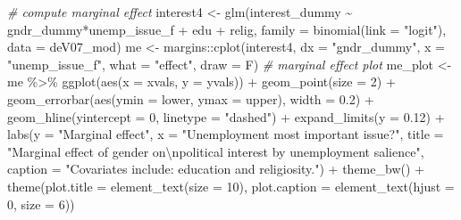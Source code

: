 \documentclass[
]{article}
\newenvironment{Shaded}{\begin{snugshade}}{\end{snugshade}}
\newcommand{\AttributeTok}[1]{\textcolor[rgb]{0.77,0.63,0.00}{#1}}
\newcommand{\CommentTok}[1]{\textcolor[rgb]{0.56,0.35,0.01}{\textit{#1}}}
\newcommand{\DecValTok}[1]{\textcolor[rgb]{0.00,0.00,0.81}{#1}}
\newcommand{\FloatTok}[1]{\textcolor[rgb]{0.00,0.00,0.81}{#1}}
\newcommand{\FunctionTok}[1]{\textcolor[rgb]{0.00,0.00,0.00}{#1}}
\newcommand{\NormalTok}[1]{#1}
\newcommand{\OtherTok}[1]{\textcolor[rgb]{0.56,0.35,0.01}{#1}}
\newcommand{\SpecialCharTok}[1]{\textcolor[rgb]{0.00,0.00,0.00}{#1}}
\newcommand{\StringTok}[1]{\textcolor[rgb]{0.31,0.60,0.02}{#1}}
\begin{document}
\begin{Shaded}
\begin{Highlighting}[]
\CommentTok{\# compute marginal effect}
\NormalTok{interest4 }\OtherTok{\textless{}{-}} \FunctionTok{glm}\NormalTok{(interest\_dummy }\SpecialCharTok{\textasciitilde{}}\NormalTok{ gndr\_dummy}\SpecialCharTok{*}\NormalTok{unemp\_issue\_f }\SpecialCharTok{+}\NormalTok{ edu }\SpecialCharTok{+}\NormalTok{ relig, }
                 \AttributeTok{family =} \FunctionTok{binomial}\NormalTok{(}\AttributeTok{link =} \StringTok{"logit"}\NormalTok{), }
                 \AttributeTok{data =}\NormalTok{ deV07\_mod)}
\NormalTok{me }\OtherTok{\textless{}{-}}\NormalTok{ margins}\SpecialCharTok{::}\FunctionTok{cplot}\NormalTok{(interest4, }\AttributeTok{dx =} \StringTok{"gndr\_dummy"}\NormalTok{, }
               \AttributeTok{x =} \StringTok{"unemp\_issue\_f"}\NormalTok{, }\AttributeTok{what =} \StringTok{"effect"}\NormalTok{, }\AttributeTok{draw =}\NormalTok{ F)}
\CommentTok{\# marginal effect plot }
\NormalTok{me\_plot }\OtherTok{\textless{}{-}}\NormalTok{ me }\SpecialCharTok{\%\textgreater{}\%}
  \FunctionTok{ggplot}\NormalTok{(}\FunctionTok{aes}\NormalTok{(}\AttributeTok{x =}\NormalTok{ xvals, }\AttributeTok{y =}\NormalTok{ yvals)) }\SpecialCharTok{+}
  \FunctionTok{geom\_point}\NormalTok{(}\AttributeTok{size =} \DecValTok{2}\NormalTok{) }\SpecialCharTok{+}
  \FunctionTok{geom\_errorbar}\NormalTok{(}\FunctionTok{aes}\NormalTok{(}\AttributeTok{ymin =}\NormalTok{ lower, }\AttributeTok{ymax =}\NormalTok{ upper), }\AttributeTok{width =} \FloatTok{0.2}\NormalTok{) }\SpecialCharTok{+}
  \FunctionTok{geom\_hline}\NormalTok{(}\AttributeTok{yintercept =} \DecValTok{0}\NormalTok{, }\AttributeTok{linetype =} \StringTok{"dashed"}\NormalTok{) }\SpecialCharTok{+}
  \FunctionTok{expand\_limits}\NormalTok{(}\AttributeTok{y =} \FloatTok{0.12}\NormalTok{) }\SpecialCharTok{+}
  \FunctionTok{labs}\NormalTok{(}\AttributeTok{y =} \StringTok{"Marginal effect"}\NormalTok{, }
       \AttributeTok{x =} \StringTok{"Unemployment most important issue?"}\NormalTok{,}
       \AttributeTok{title =} \StringTok{"Marginal effect of gender on}\SpecialCharTok{\textbackslash{}n}\StringTok{political interest by unemployment salience"}\NormalTok{,}
       \AttributeTok{caption =} \StringTok{"Covariates include: education and religiosity."}\NormalTok{) }\SpecialCharTok{+}
  \FunctionTok{theme\_bw}\NormalTok{() }\SpecialCharTok{+}
  \FunctionTok{theme}\NormalTok{(}\AttributeTok{plot.title =} \FunctionTok{element\_text}\NormalTok{(}\AttributeTok{size =} \DecValTok{10}\NormalTok{),}
        \AttributeTok{plot.caption =} \FunctionTok{element\_text}\NormalTok{(}\AttributeTok{hjust =} \DecValTok{0}\NormalTok{, }\AttributeTok{size =} \DecValTok{6}\NormalTok{))}
\end{Highlighting}
\end{Shaded}
\end{document}
